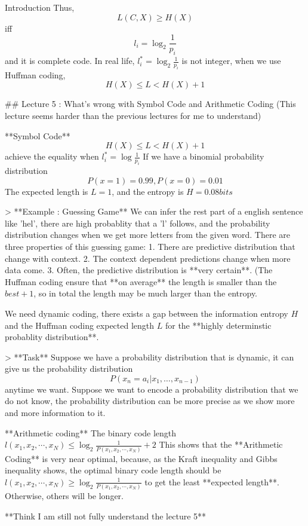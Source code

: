 \documentclass{beamer}
\begin{document}
\begin{frame}[allowframebreaks]{Introduction}
    Thus, $$L(C,X) \ge H(X)$$ iff $$l_i=\log_2 \frac{1}{p_i}$$ and it is complete code.
    In real life, $l_i^* = \log_2\frac{1}{p_i}$ is not integer, when we use Huffman coding, $$H(X)\le L \lt H(X) + 1$$ 
    
    ## Lecture 5 : What's wrong with Symbol Code and Arithmetic Coding
    (This lecture seems harder than the previous lectures for me to understand)
    
    **Symbol Code**
    $$H(X) \le L \lt H(X) + 1$$ achieve the equality when $l_i^*=\log\frac{1}{p_i}$
    If we have a binomial probability distribution $$P(x=1) = 0.99, P(x=0) = 0.01$$ The expected length is $L=1$, and the entropy is $H=0.08 bits$
    
    > **Example : Guessing Game**
    We can infer the rest part of a english sentence like 'hel', there are high probablity that a 'l' follows, and the probability distribution changes when we get more letters from the given word. 
    There are three properties of this guessing game:
    1. There are predictive distribution that change with context.
    2. The context dependent predictions change when more data come.
    3. Often, the predictive distribution is **very certain**. (The Huffman coding ensure that **on average** the length is smaller than the $best + 1$, so in total the length may be much larger than the entropy.
    
    We need dynamic coding, there exists a gap between the information entropy $H$ and the Huffman coding expected length $L$ for the **highly determinstic probablity distribution**. 
    
    > **Task**
    Suppose we have a probability distribution that is dynamic, it can give us the probability distribution $$P(x_n = a_i|x_1, \dots, x_{n-1})$$ anytime we want.
    Suppose we want to encode a probability distribution that we do not know, the probability distribution can be more precise as we show more and more information to it. 
    
    **Arithmetic coding**
    The binary code length $l(x_1, x_2, \cdots, x_N) \le \log_2 \frac{1}{P(x_1, x_2, \cdots, x_N)} + 2$
    This shows that the **Arithmetic Coding** is very near optimal, because, as the Kraft inequality and Gibbs inequality shows, the optimal binary code length should be $l(x_1, x_2, \cdots, x_N) \ge \log_2 \frac{1}{P(x_1, x_2, \cdots, x_N)}$ to get the least **expected length**. Otherwise, others will be longer.  
    
    **Think I am still not fully understand the lecture 5**
    

\end{frame}
\end{document}
